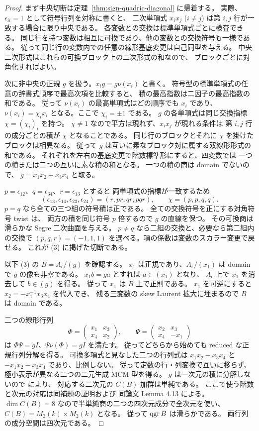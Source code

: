\begin{proof}
まず中央切断は定理~\ref{thm:sign-quadric-diagonal} に帰着する。
実際、$\epsilon_{ii}=1$ として符号行列を対称に書くと、
二次単項式 $x_i x_j$ ($i\ne j$) は第 $i,j$ 行が一致する場合に限り中央である。
各変数との交換は標準単項式ごとに検査できる。
同じ行を持つ変数は相互に可換であり、他の変数との交換符号も一様である。
従って同じ行の変数内での任意の線形基底変更は自己同型を与える。
中央二次形式はこれらの可換ブロック上の二次形式の和なので、
ブロックごとに対角化すればよい。

次に非中央の正規 $g$ を扱う。$x_i g=g\nu(x_i)$ と書く。
符号型の標準単項式の任意の辞書式順序で最高次項を比較すると、
積の最高指数は二因子の最高指数の和である。
従って $\nu(x_i)$ の最高単項式はどの順序でも $x_i$ であり、
$\nu(x_i)=\chi_i x_i$ となる。ここで $\chi_i=\pm1$ である。
$g$ の各単項式は同じ交換指標 $\chi=(\chi_i)_i$ を持つ。
$\chi\ne1$ なので平方は現れず、$x_i x_j$ が現れる条件は
第 $i,j$ 行の成分ごとの積が $\chi$ となることである。
同じ行のブロックとそれに $\chi$ を掛けたブロックは相異なる。
従って $g$ は互いに素なブロック対に属する双線形形式の和である。
それぞれを左右の基底変更で階数標準形にすると、四変数では
一つの積または二つの互いに素な積の和となる。
一つの積の商は domain でないので、
$g=x_1x_2+x_3x_4$ と取る。

$p=\epsilon_{12}$、$q=\epsilon_{34}$、$r=\epsilon_{13}$ とすると
両単項式の指標が一致するため
\[
 (\epsilon_{13},\epsilon_{14},\epsilon_{23},\epsilon_{24})
       =(r,pr,qr,pqr),\qquad
 \chi=(p,p,q,q).
\]
$p=q$ なら全ての三つ組の符号積は正である。
全ての交換符号を正にする対角符号 twist は、
両方の積を同じ符号 $p$ 倍するので $g$ の直線を保つ。
その可換商は滑らかな Segre 二次曲面を与える。
$p\ne q$ なら二組の交換と、必要なら第二組内の交換で
$(p,q,r)=(-1,1,1)$ を選べる。項の係数は変数のスカラー変更で戻せる。
これが (3) に掲げた切断である。

以下 (3) の $B=A_\epsilon/(g)$ を確認する。
$x_1$ は正規であり、$A_\epsilon/(x_1)$ は domain で $g$ の像も非零である。
$x_1 b=ga$ とすれば $a\in (x_1)$ となり、
$A_\epsilon$ 上で $x_1$ を消去して $b\in(g)$ を得る。
従って $x_1$ は $B$ 上で正則である。
$x_1$ を可逆にすると $x_2=-x_1^{-1}x_3x_4$ を代入でき、
残る三変数の skew Laurent 拡大に埋まるので $B$ は domain である。

二つの線形行列
\[
 \Phi=\begin{pmatrix}x_1&x_3\\x_4&x_2\end{pmatrix},\qquad
 \Psi=\begin{pmatrix}x_2&x_3\\x_4&-x_1\end{pmatrix}
\]
は $\Phi\Psi=gI$、$\Psi\nu(\Phi)=gI$ を満たす。
従ってどちらから始めても reduced な正規行列分解を得る。
可換多項式と見なした二つの行列式は
$x_1x_2-x_3x_4$ と $-x_1x_2-x_3x_4$ であり、比例しない。
従って定数の行・列変換で互いに移らず、
極小表示が異なる二つの二元生成 MCM 型を得る。
$g$ は一次元の積に分解しないので
\cite[Lemma 5.11]{MU2022} により、
対応する二次元の $C(B)$-加群は単純である。
ここで使う階数と次元の対応は同補題の証明および
同論文 Lemma 4.13 による。
$\dim C(B)=8$ なので半単純商の二つの四次元成分で全次元を使い、
$C(B)=M_2(k)\times M_2(k)$ となる。
従って $\operatorname{qgr} B$ は滑らかである。
両行列の成分空間は四次元である。


\end{proof}
